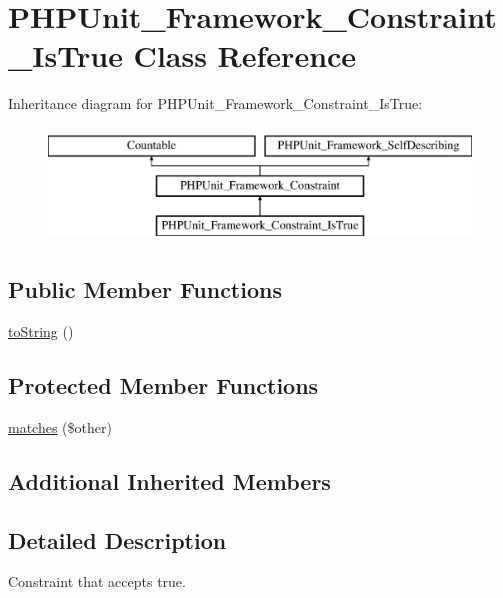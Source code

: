 \hypertarget{class_p_h_p_unit___framework___constraint___is_true}{}\section{P\+H\+P\+Unit\+\_\+\+Framework\+\_\+\+Constraint\+\_\+\+Is\+True Class Reference}
\label{class_p_h_p_unit___framework___constraint___is_true}
Inheritance diagram for P\+H\+P\+Unit\+\_\+\+Framework\+\_\+\+Constraint\+\_\+\+Is\+True\+:\begin{figure}[H]
\begin{center}
\leavevmode
\includegraphics[height=3.000000cm]{class_p_h_p_unit___framework___constraint___is_true}
\end{center}
\end{figure}
\subsection*{Public Member Functions}
\begin{DoxyCompactItemize}
\item 
\mbox{\hyperlink{class_p_h_p_unit___framework___constraint___is_true_a5558c5d549f41597377fa1ea8a1cefa3}{to\+String}} ()
\end{DoxyCompactItemize}
\subsection*{Protected Member Functions}
\begin{DoxyCompactItemize}
\item 
\mbox{\hyperlink{class_p_h_p_unit___framework___constraint___is_true_a9c9c337de483bbdbb9fa249a6c7c9cc5}{matches}} (\$other)
\end{DoxyCompactItemize}
\subsection*{Additional Inherited Members}


\subsection{Detailed Description}
Constraint that accepts true. 

